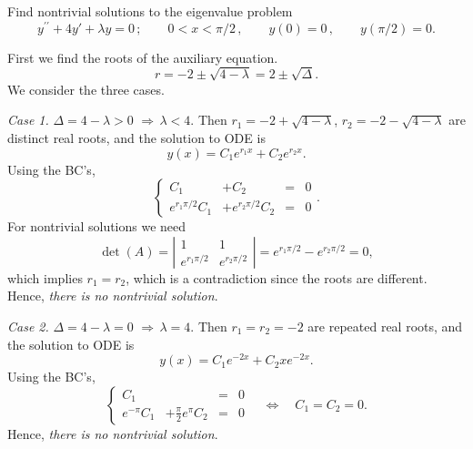 \documentclass[11pt]{article}
\begin{document}
\begin{problem}
 Find nontrivial solutions to the eigenvalue problem
\begin{equation*}
y^{\prime \prime} + 4 y' + \lambda y =0\,; \qquad  0<x<\pi/2 \,, \qquad y(0)=0  \,,\qquad y(\pi/2) =0. 
\end{equation*}
\end{problem}
\begin{solution}
First we find the roots of the auxiliary equation.
\[r=-2\pm\sqrt{4-\lambda}=2\pm\sqrt{\Delta}.\]
We consider the three cases.\\

\par \textsl{Case 1.} $\Delta = 4-\lambda >0 \,\, \Rightarrow \, \lambda<4.$ Then $r_{1}=-2+\sqrt{4-\lambda}$, $r_{2}=-2-\sqrt{4-\lambda}$ are distinct real roots, and the solution to ODE is
\[y(x)=C_{1}e^{r_{1}x}+C_{2}e^{r_{2}x}.\]
Using the BC's,
\begin{equation*}
\left\{\begin{array}{rrcc}
       C_{1} &+C_{2}&=&0\\
       e^{r_{1}\pi/2}C_{1} &+ e^{r_{2}\pi/2}C_{2}&=&0
      \end{array}\right. .
\end{equation*}
For nontrivial solutions we need 
$$\det(A)=\left|\begin{matrix} 1 & 1 \\ e^{r_{1}\pi/2} & e^{r_{2}\pi/2}\end{matrix}\right|=e^{r_{1}\pi/2}-e^{r_{2}\pi/2}=0,$$ 
which implies $r_{1}=r_{2}$, which is a contradiction since the roots are different. Hence, \textsl{there is no nontrivial solution}.

\par \textsl{Case 2.} $\Delta = 4-\lambda =0 \,\, \Rightarrow \, \lambda=4.$ Then $r_{1}=r_{2}=-2$ are repeated real roots, and the solution to ODE is
\[y(x)=C_{1}e^{-2x}+C_{2}xe^{-2x}.\]
Using the BC's,
\begin{equation*}
\left\{\begin{array}{rrcc}
       C_{1} & &= &0\\
       e^{-\pi}C_{1} & +\tfrac{\pi}{2}e^{\pi}C_{2} &= &0
      \end{array}\right. \quad \Leftrightarrow \quad C_{1}=C_{2}=0.
\end{equation*}
Hence, \textsl{there is no nontrivial solution}.


\end{solution}
\end{document}
